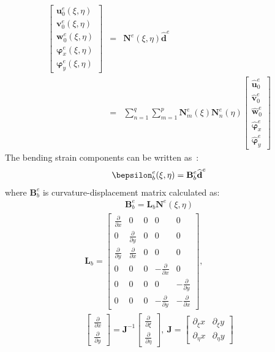 \documentclass[a4paper,12pt]{article}
\begin{document}
\begin{eqnarray}
\left [ \begin{array}{c}
\textbf{u}_0^e(\xi,\eta) \\
\textbf{v}_0^e(\xi,\eta) \\
\textbf{w}_0^e(\xi,\eta) \\
\boldsymbol{\varphi}_x^e(\xi,\eta) \\
\boldsymbol{\varphi}_y^e(\xi,\eta)
\end{array} \right]
& = & \textbf{N}^e(\xi,\eta)\widehat{\textbf{d}}^e\nonumber\\
& = & \sum_{n=1}^q\sum_{m=1}^p\textbf{N}_m^e(\xi)\textbf{N}_n^e(\eta)
\left [ \begin{array}{c}
\widehat{\textbf{u}}_0^e \\
\widehat{\textbf{v}}_0^e \\
\widehat{\textbf{w}}_0^e \\
\widehat{\boldsymbol{\varphi}}_x^e \\
\widehat{\boldsymbol{\varphi}}_y^e
\end{array} \right]
\end{eqnarray}
The bending strain components can be written as~\cite{ferreira2008matlab}:
\begin{eqnarray}
\bepsilon_b^e(\xi,\eta)=\textbf{B}_b^e\widehat{\textbf{d}}^e
\end{eqnarray}
where $\textbf{B}_b^e$ is curvature-displacement matrix calculated as:
\begin{eqnarray}
\textbf{B}_b^e=\textbf{L}_b\textbf{N}^e(\xi,\eta)
\end{eqnarray}
\begin{eqnarray}
	\textbf{L}_b=\left [
	\begin{array}{ccccc}
		\frac{\partial }{\partial x} & 0 & 0 & 0 & 0\\
		0 & \frac{\partial }{\partial y} & 0 & 0 & 0\\
		\frac{\partial }{\partial y} & \frac{\partial }{\partial x} & 0 & 0 & 0\\
		0 & 0 & 0 & -\frac{\partial }{\partial x} & 0\\
		0 & 0 & 0 & 0 & -\frac{\partial }{\partial y}\\
		0 & 0 & 0 & -\frac{\partial }{\partial y} & -\frac{\partial }{\partial x}
	\end{array} \right],\ \\
  \left [
	\begin{array}{c}
		\frac{\partial }{\partial x}\\
		\frac{\partial }{\partial y}
	\end{array} \right] =\textbf{J}^{-1}
	\left [
	\begin{array}{c}
		\frac{\partial }{\partial \xi}\\
		\frac{\partial }{\partial \eta}
	\end{array} \right], \ 
	\textbf{J}=\left [
	\begin{array}{cc}
		\partial_\xi x & {\partial_\xi y} \\
		\partial_\eta x & {\partial_\eta y}
	\end{array} \right] \nonumber
\end{eqnarray}
\end{document}
